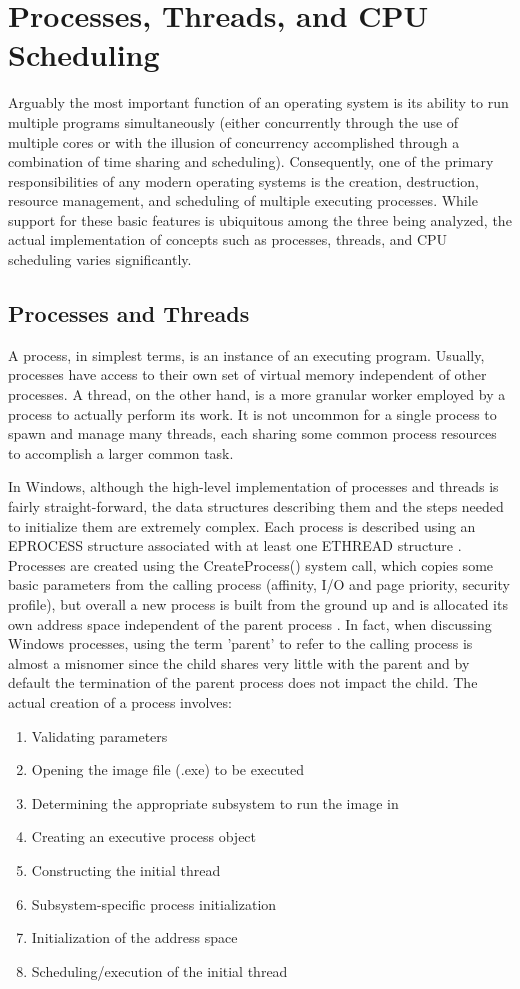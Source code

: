 \documentclass[onecolumn, draftclsnofoot,10pt, compsoc]{IEEEtran}
\begin{document}
\section{Processes, Threads, and CPU Scheduling}
Arguably the most important function of an operating system is its ability to run multiple programs simultaneously (either concurrently through the use of multiple cores or with the illusion of concurrency accomplished through a combination of time sharing and scheduling). Consequently, one of the primary responsibilities of any modern operating systems is the creation, destruction, resource management, and scheduling of multiple executing processes. While support for these basic features is ubiquitous among the three being analyzed, the actual implementation of concepts such as processes, threads, and CPU scheduling varies significantly.
\subsection{Processes and Threads}
A process, in simplest terms, is an instance of an executing program. Usually, processes have access to their own set of virtual memory independent of other processes. A thread, on the other hand, is a more granular worker employed by a process to actually perform its work. It is not uncommon for a single process to spawn and manage many threads, each sharing some common process resources to accomplish a larger common task.

In Windows, although the high-level implementation of processes and threads is fairly straight-forward, the data structures describing them and the steps needed to initialize them are extremely complex. Each process is described using an EPROCESS structure associated with at least one ETHREAD structure \cite{WindowsInternals}. Processes are created using the CreateProcess() system call, which copies some basic parameters from the calling process (affinity, I/O and page priority, security profile), but overall a new process is built from the ground up and is allocated its own address space independent of the parent process \cite{WindowsInternals}. In fact, when discussing Windows processes, using the term 'parent' to refer to the calling process is almost a misnomer since the child shares very little with the parent and by default the termination of the parent process does not impact the child. The actual creation of a process involves:
\begin{enumerate}
\item Validating parameters 
\item Opening the image file (.exe) to be executed
\item Determining the appropriate subsystem to run the image in 
\item Creating an executive process object
\item Constructing the initial thread
\item Subsystem-specific process initialization
\item Initialization of the address space
\item Scheduling/execution of the initial thread
\end{enumerate}
\end{document}

